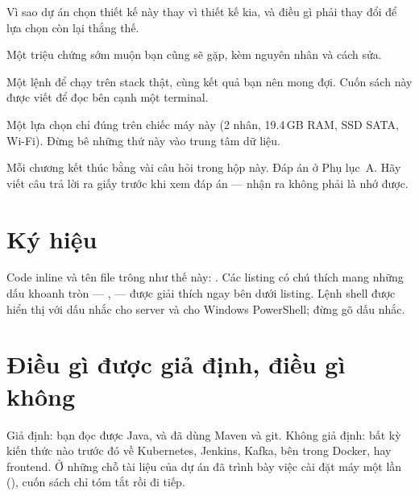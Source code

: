 \begin{decision}[ví dụ]
Vì sao dự án chọn thiết kế này thay vì thiết kế kia, và điều gì phải thay
đổi để lựa chọn còn lại thắng thế.
\end{decision}

\begin{pitfall}[ví dụ]
Một triệu chứng sớm muộn bạn cũng sẽ gặp, kèm nguyên nhân và cách sửa.
\end{pitfall}

\begin{handson}[ví dụ]
Một lệnh để chạy trên stack thật, cùng kết quả bạn nên mong đợi. Cuốn
sách này được viết để đọc bên cạnh một terminal.
\end{handson}

\begin{hardware}[ví dụ]
Một lựa chọn chỉ đúng trên chiếc máy này (2 nhân, 19.4\,GB RAM, SSD
SATA, Wi-Fi). Đừng bê những thứ này vào trung tâm dữ liệu.
\end{hardware}

\begin{quiz}
Mỗi chương kết thúc bằng vài câu hỏi trong hộp này. Đáp án ở
Phụ lục~A. Hãy viết câu trả lời ra giấy trước khi xem đáp án --- nhận ra
không phải là nhớ được.
\end{quiz}

\section*{Ký hiệu}

Code inline và tên file trông như thế này: . Các
listing có chú thích mang những dấu khoanh tròn --- ,  --- được
giải thích ngay bên dưới listing. Lệnh shell được hiển thị với dấu nhắc
\code{\$} cho server và  cho Windows PowerShell; đừng gõ dấu
nhắc.

\section*{Điều gì được giả định, điều gì không}

Giả định: bạn đọc được Java, và đã dùng Maven và git. Không giả định:
bất kỳ kiến thức nào trước đó về Kubernetes, Jenkins, Kafka, bên trong
Docker, hay frontend. Ở những chỗ tài liệu của dự án đã trình bày việc cài
đặt máy một lần (), cuốn sách chỉ tóm
tắt rồi đi tiếp.
